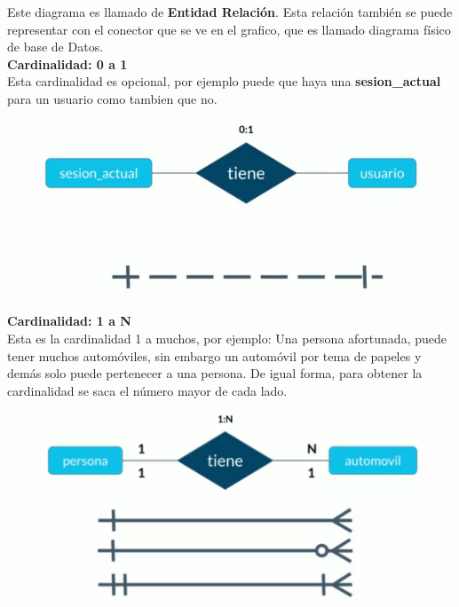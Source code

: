 \documentclass{article}
\begin{document}
Este diagrama es llamado de \textbf{Entidad Relación}. Esta relación también se
puede representar con el conector que se ve en el grafico, que es llamado
diagrama físico de base de Datos.\\

\textbf{Cardinalidad: 0 a 1}\\
Esta cardinalidad es opcional, por ejemplo puede que haya una
\textbf{sesion\_actual} para un usuario como tambien que no.

\begin{figure}[h!]
    \centering
      \includegraphics[scale=0.45]{./Pictures/015_card_0_1.png}
\end{figure}

\newpage

\textbf{Cardinalidad: 1 a N}\\
Esta es la cardinalidad 1 a muchos, por ejemplo: Una persona afortunada, puede
tener muchos automóviles, sin embargo un automóvil por tema de papeles y demás
solo puede pertenecer a una persona. De igual forma, para obtener la
cardinalidad se saca el número mayor de cada lado.\\

\begin{figure}[h!]
    \centering
      \includegraphics[scale=0.45]{./Pictures/016_card_1_N.png}
\end{figure}
\end{document}
